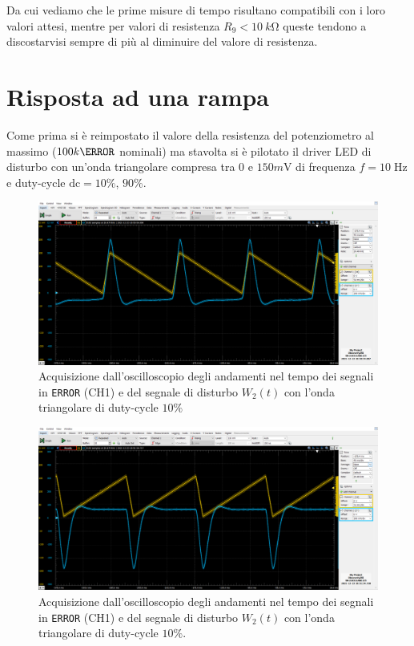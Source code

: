 \documentclass[10pt, a4paper, italian]{article}
\begin{document}
Da cui vediamo che le prime misure di tempo risultano compatibili con i loro
valori attesi, mentre per valori di resistenza $R_9 < \SI{10}{k\ohm}$ queste
tendono a discostarvisi sempre di più al diminuire del valore di resistenza.

\section{Risposta ad una rampa}
Come prima si è reimpostato il valore della resistenza del potenziometro al
massimo ($100 k\ohm$ nominali) ma stavolta si è pilotato il driver LED di
disturbo con un'onda triangolare compresa tra $0$ e $150 \si{m\V}$ di frequenza
$f = 10 \; \si{\Hz}$ e duty-cycle $\text{dc} = 10 \percent$, $90 \percent$.
\begin{figure}[htbp]
    \centering
	\includegraphics[width=\textwidth]{8}
    \caption{Acquisizione dall'oscilloscopio degli andamenti nel tempo dei
    segnali in \texttt{ERROR} (CH1) e del segnale di disturbo $W_2 (t)$
    con l'onda triangolare di duty-cycle $10 \percent$
    \label{fig: erramp10}}
\end{figure}
\begin{figure}[htbp]
    \centering
	\includegraphics[width=\textwidth]{8.1}
    \caption{Acquisizione dall'oscilloscopio degli andamenti nel tempo dei
    segnali in \texttt{ERROR} (CH1) e del segnale di disturbo $W_2 (t)$
    con l'onda triangolare di duty-cycle $10 \percent$.
    \label{fig: erramp90}}
\end{figure}
\end{document}
